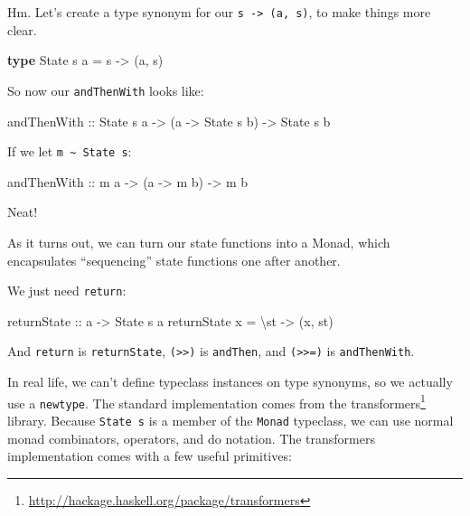 \documentclass[]{article}
\newenvironment{Shaded}{}{}
\newcommand{\KeywordTok}[1]{\textcolor[rgb]{0.00,0.44,0.13}{\textbf{{#1}}}}
\newcommand{\DataTypeTok}[1]{\textcolor[rgb]{0.56,0.13,0.00}{{#1}}}
\newcommand{\OtherTok}[1]{\textcolor[rgb]{0.00,0.44,0.13}{{#1}}}
\newcommand{\FunctionTok}[1]{\textcolor[rgb]{0.02,0.16,0.49}{{#1}}}
\newcommand{\NormalTok}[1]{{#1}}
\renewcommand{\href}[2]{#2\footnote{\url{#1}}}
\begin{document}
Hm. Let's create a type synonym for our
\texttt{s\ -\textgreater{}\ (a,\ s)}, to make things more clear.

\begin{Shaded}
\begin{Highlighting}[]
\KeywordTok{type} \DataTypeTok{State} \NormalTok{s a }\FunctionTok{=} \NormalTok{s }\OtherTok{->} \NormalTok{(a, s)}
\end{Highlighting}
\end{Shaded}

So now our \texttt{andThenWith} looks like:

\begin{Shaded}
\begin{Highlighting}[]
\OtherTok{andThenWith ::} \DataTypeTok{State} \NormalTok{s a }\OtherTok{->} \NormalTok{(a }\OtherTok{->} \DataTypeTok{State} \NormalTok{s b) }\OtherTok{->} \DataTypeTok{State} \NormalTok{s b}
\end{Highlighting}
\end{Shaded}

If we let \texttt{m\ \textasciitilde{}\ State\ s}:

\begin{Shaded}
\begin{Highlighting}[]
\OtherTok{andThenWith ::} \NormalTok{m a }\OtherTok{->} \NormalTok{(a }\OtherTok{->} \NormalTok{m b) }\OtherTok{->} \NormalTok{m b}
\end{Highlighting}
\end{Shaded}

Neat!

As it turns out, we can turn our state functions into a Monad, which
encapsulates ``sequencing'' state functions one after another.

We just need \texttt{return}:

\begin{Shaded}
\begin{Highlighting}[]
\OtherTok{returnState ::} \NormalTok{a }\OtherTok{->} \DataTypeTok{State} \NormalTok{s a}
\NormalTok{returnState x }\FunctionTok{=} \NormalTok{\textbackslash{}st }\OtherTok{->} \NormalTok{(x, st)}
\end{Highlighting}
\end{Shaded}

And \texttt{return} is \texttt{returnState},
\texttt{(\textgreater{}\textgreater{})} is \texttt{andThen}, and
\texttt{(\textgreater{}\textgreater{}=)} is \texttt{andThenWith}.

In real life, we can't define typeclass instances on type synonyms, so
we actually use a \texttt{newtype}. The standard implementation comes
from the
\href{http://hackage.haskell.org/package/transformers}{transformers}
library. Because \texttt{State\ s} is a member of the \texttt{Monad}
typeclass, we can use normal monad combinators, operators, and do
notation. The transformers implementation comes with a few useful
primitives:
\end{document}
